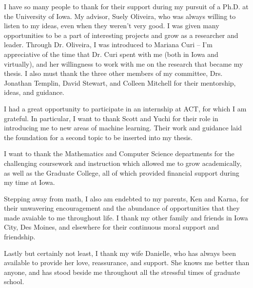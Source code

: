 I have so many people to thank for their support during my pursuit of a Ph.D. at the University of Iowa. My advisor, Suely Oliveira, who was always willing to listen to my ideas, even when they weren't very good. I was given many opportunities to be a part of interesting projects and grow as a researcher and leader. Through Dr. Oliveira, I was introduced to Mariana Curi -- I'm appreciative of the time that Dr. Curi spent with me (both in Iowa and virtually), and her willingness to work with me on the research that became my thesis. I also must thank the three other members of my committee, Drs. Jonathan Templin, David Stewart, and Colleen Mitchell for their mentorship, ideas, and guidance.

I had a great opportunity to participate in an internship at ACT, for which I am grateful. In particular, I want to thank Scott and Yuchi for their role in introducing me to new areas of machine learning. Their work and guidance laid the foundation for a second topic to be inserted into my thesis.

I want to thank the Mathematics and Computer Science departments for the challenging coursework and instruction which allowed me to grow academically, as well as the Graduate College, all of which provided financial support during my time at Iowa.

Stepping away from math, I also am endebted to my parents, Ken and Karna, for their unwavering encouragement and the abundance of opportunities that they made avaiable to me throughout life. I thank my other family and friends in Iowa City, Des Moines, and elsewhere for their continuous moral support and friendship.

Lastly but certainly not least, I thank my wife Danielle, who has always been available to provide her love, reassurance, and support. She knows me better than anyone, and has stood beside me throughout all the stressful times of graduate school.

